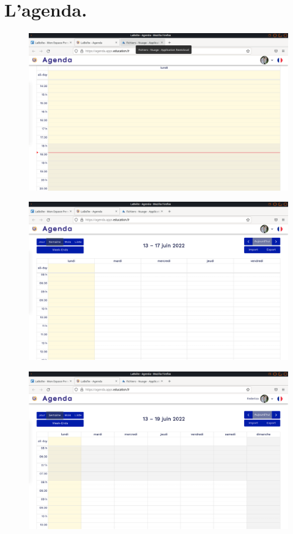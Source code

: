 \chapter*{L'agenda.}

\begin{figure}
    \centering
    \includegraphics{Captures/agenda.jour.png}
\end{figure}

\begin{figure}
    \centering
    \includegraphics{Captures/agenda.semaine.png}
\end{figure}

\begin{figure}
    \centering
    \includegraphics{Captures/agenda.semaine.we.png}
\end{figure}

